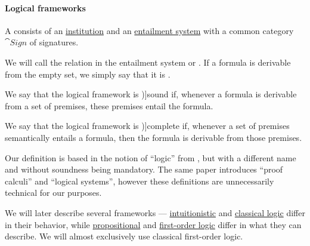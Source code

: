 \paragraph{Logical frameworks}

\begin{definition}\label{def:logical_framework}\mimprovised
  A  consists of an \hyperref[def:institution]{institution} and an \hyperref[def:entailment_system]{entailment system} with a common category \( \cat{Sign} \) of signatures.

  We will call the relation in the entailment system  or . If a formula is derivable from the empty set, we simply say that it is .

  \begin{thmenum}
     We say that the logical framework is \term[ru=корректная (система) (\cite[37]{Герасимов2011})]{sound} if, whenever a formula is derivable from a set of premises, these premises entail the formula.

     We say that the logical framework is \term[ru=полная (система) (\cite[44]{Герасимов2011})]{complete} if, whenever a set of premises semantically entails a formula, then the formula is derivable from those premises.
  \end{thmenum}
\end{definition}
\begin{comments}
  \item Our definition is based in the notion of \enquote{logic} from \cite[def. 6]{Meseguer1989}, but with a different name and without soundness being mandatory. The same paper introduces \enquote{proof calculi} and \enquote{logical systems}, however these definitions are unnecessarily technical for our purposes.
  \item We will later describe several frameworks --- \hyperref[def:intuitionistic_logic]{intuitionistic} and \hyperref[def:classical_logic]{classical logic} differ in their behavior, while \hyperref[subsec:propositional_logic]{propositional} and \hyperref[subsec:first_order_logic]{first-order logic} differ in what they can describe. We will almost exclusively use classical first-order logic.
\end{comments}

